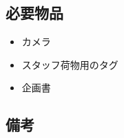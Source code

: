 
\subsection{必要物品}
\begin{itemize}
\item カメラ
\item スタッフ荷物用のタグ
\item 企画書
\end{itemize}

\subsection{備考}

%


